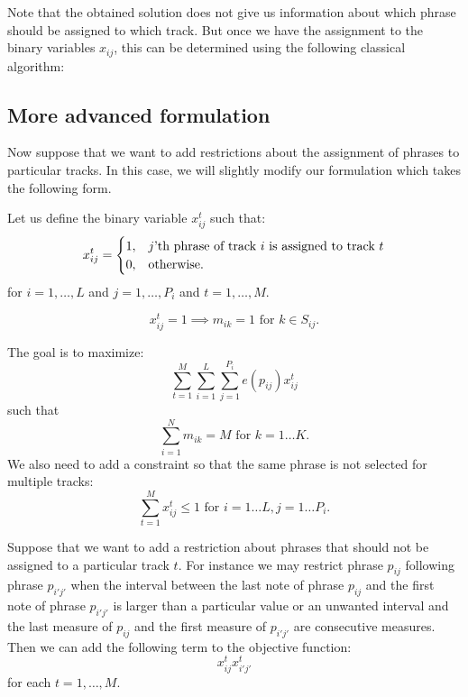\documentclass[11pt,a4paper]{article}
\begin{document}
 Note that the obtained solution does not give us information about which phrase should be assigned to which track. But once we have the assignment to the binary variables $ x_{ij} $, this can be determined using the following classical algorithm:
 
 \subsection{More advanced formulation}
 
 Now suppose that we want to add restrictions about the assignment of phrases to particular tracks. In this case, we will slightly modify our formulation which takes the following form.
 
  Let us define the binary variable $x_{ij}^t$ such that:
 \begin{equation}
 x_{ij}^t =   \begin{cases}%
 1,      & \text{$j$'th phrase of track $i$ is assigned to track $ t $}\\
 0, & \text{otherwise.}
 \end{cases}
 \end{equation}
 for $ i = 1, \dots ,L $ and $ j=1, \dots ,P_i  $ and $ t = 1, \dots, M $.
 
\begin{equation}
 x_{ij}^t = 1 \implies m_{ik}=1 \mbox{ for } k \in S_{ij}.
 \end{equation}

 The goal is to maximize:
 \begin{equation}
 \sum_{t=1}^M \sum_{i=1}^L\sum_{j=1}^{P_i} e(p_{ij})x_{ij}^t
 \end{equation}
 such that
 \begin{equation}
 \sum_{i=1}^N m_{ik} = M \mbox{ for }k=1\dots K. 
 \end{equation} 
 We also need to add a constraint so that the same phrase is not selected for multiple tracks:
  \begin{equation}
 \sum_{t=1}^M x_{ij}^t \leq 1 \mbox{ for }i=1\dots L, j=1 \dots P_i. 
 \end{equation}
 
 Suppose that we want to add a restriction about phrases that should not be assigned to a particular track $ t $. For instance we may restrict phrase $ p_{ij} $ following phrase $ p_{i'j'} $ when the interval between the last note of phrase $ p_{ij} $ and the first note of phrase $p_{i'j'} $ is larger than a particular value or an unwanted interval and the last measure of $ p_{ij} $ and the first measure of $ p_{i'j'} $ are consecutive measures. Then we can add the following term to the objective function:
 \begin{equation}
 x_{ij}^tx_{i'j'}^t
 \end{equation} 
 for each $ t=1,\dots,M $.
 
\end{document}
